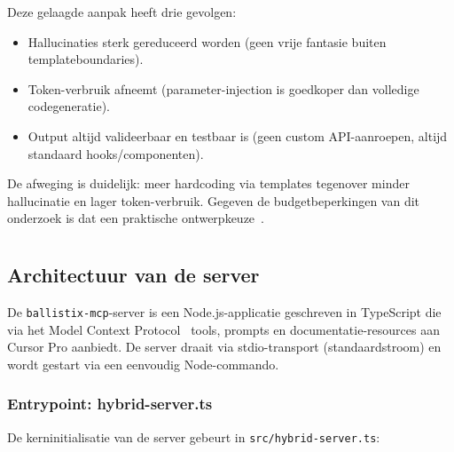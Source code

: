 Deze gelaagde aanpak heeft drie gevolgen:

\begin{itemize}
  \item Hallucinaties sterk gereduceerd worden (geen vrije fantasie buiten templateboundaries).
  \item Token-verbruik afneemt (parameter-injection is goedkoper dan volledige codegeneratie).
  \item Output altijd valideerbaar en testbaar is (geen custom API-aanroepen, altijd standaard hooks/componenten).
\end{itemize}

De afweging is duidelijk: meer hardcoding via templates tegenover minder hallucinatie en lager token-verbruik. Gegeven de budgetbeperkingen van dit onderzoek is dat een praktische ontwerpkeuze~\autocite{CursorTokenTracking2025}.

\section{}
\label{sec:poc-setup}

\subsection{Architectuur van de server}

De \texttt{ballistix-mcp}-server is een Node.js-applicatie geschreven in TypeScript die via het Model Context Protocol~\autocite{MCPTypeScriptSDK2025} tools, prompts en documentatie-resources aan Cursor Pro aanbiedt. De server draait via stdio-transport (standaardstroom) en wordt gestart via een eenvoudig Node-commando.

\subsubsection{Entrypoint: hybrid-server.ts}

De kerninitialisatie van de server gebeurt in \texttt{src/hybrid-server.ts}:

